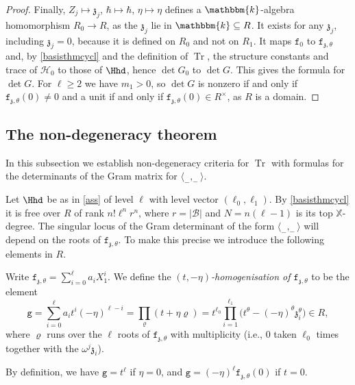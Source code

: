 \documentclass[a4paper,11pt]{amsart}
\newcommand{\Tr}{\op{Tr}}
\newcommand\cB{\mathcal{B}}
\numberwithin{equation}{subsection}
\theoremstyle{definition}
\theoremstyle{theorem}
\theoremstyle{remark}
\newcommand\charge{{\mathfrak{z}}}
\newcommand\kapp{{\mathfrak{z}}}
\newcommand\fct{\mathtt{f}_{\charge,\theta}}
\newcommand\gcy{\mathtt{g}}
\newcommand\op{\operatorname}
\newcommand\X{\mathbb{X}}
\newcommand\kk{\mathbbm{k}}
\begin{document}
\begin{proof}
Finally, $Z_j\mapsto\kapp_j$, $\hbar\mapsto\hbar$, $\eta\mapsto\eta$ defines a $\kk$-algebra homomorphism $R_0\to R$, as the $\kapp_j$ lie in $\kk\subseteq R$. It exists for any $\kapp_j$, including $\kapp_j=0$, because it is defined on $R_0$ and not on $R_1$. It maps $\mathtt f_0$ to $\fct$ and, by \autoref{basisthmcycl} and the definition of $\Tr$, the structure constants and trace of $\mathcal H_0$ to those of $\Hhd$, hence $\det G_0$ to $\det G$. This gives the formula for $\det G$. For $\ell\geq2$ we have $m_1>0$, so $\det G$ is nonzero if and only if $\fct(0)\not=0$ and a unit if and only if $\fct(0)\in R^{\times}$, as $R$ is a domain.
\end{proof}

\subsection{The non-degeneracy theorem}
In this subsection we establish non-degeneracy criteria for $\Tr$ with formulas for the determinants of the Gram matrix for $\langle_-,_-\rangle$.

Let $\Hhd$ be as in \autoref{ass} of level
$\ell$ with level vector $(\ell_0,\ell_1)$. By \autoref{basisthmcycl} it is free
over $R$ of rank $n!\ell^{n}r^{n}$, where $r=|\cB|$ and
$N=n(\ell-1)$ is its top $\X$-degree.  The singular locus of the Gram determinant of the form $\langle_-,_-\rangle$ will depend on the roots of $\fct$. To make this precise we introduce the following elements in $R$.
\begin{Definition}
Write $\fct=\sum_{i=0}^{\ell}a_iX_1^{i}$. We define the \emph{$(t,-\eta)$-homogenisation of $\fct$} to be the element
\begin{equation}\label{E:g}
  \gcy=\sum_{i=0}^{\ell}a_it^{i}(-\eta)^{\ell-i}
      =\prod_{\varrho}(t+\eta\varrho)
      =t^{\ell_0}\prod_{i=1}^{\ell_1}
          \bigl(t^{\theta}-(-\eta)^{\theta}\kapp_i^{\theta}\bigr) \in R,
\end{equation}
 where $\varrho$ runs over the
$\ell$ roots of $\fct$ with multiplicity (i.e., $0$ taken $\ell_0$ times
together with the $\omega^{j}\kapp_i$).
\end{Definition}
\begin{Remark}\label{specialg}
By definition, we have  $\gcy=t^{\ell}$ if $\eta=0$,
and $\gcy=(-\eta)^{\ell}\fct(0)$ if $t=0$.
\end{Remark}
\end{document}
